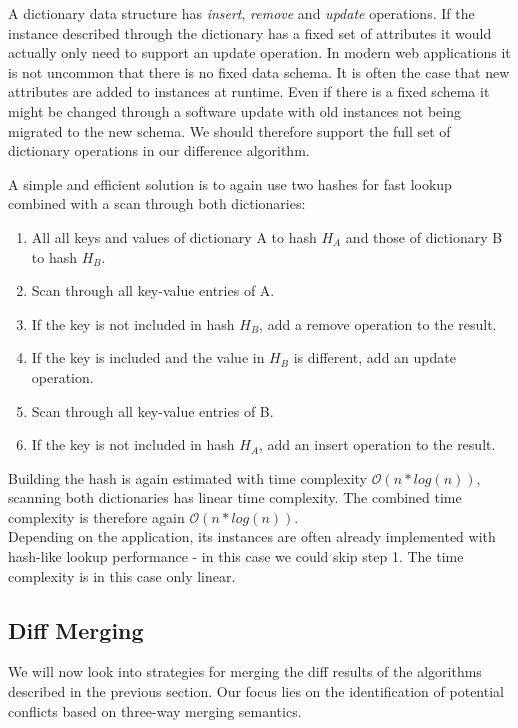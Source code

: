 A dictionary data structure has \emph{insert}, \emph{remove} and \emph{update} operations.
If the instance described through the dictionary has a fixed set of attributes it would actually only need to support an update operation.
In modern web applications it is not uncommon that there is no fixed data schema.
It is often the case that new attributes are added to instances at runtime.
Even if there is a fixed schema it might be changed through a software update with old instances not being migrated to the new schema.
We should therefore support the full set of dictionary operations in our difference algorithm.

A simple and efficient solution is to again use two hashes for fast lookup combined with a scan through both dictionaries:

\begin{enumerate}
\item All all keys and values of dictionary A to hash $ H_A $ and those of dictionary B to hash $ H_B $.
\item Scan through all key-value entries of A.
\item If the key is not included in hash $ H_B $, add a remove operation to the result.
\item If the key is included and the value in $ H_B $ is different, add an update operation.
\item Scan through all key-value entries of B.
\item If the key is not included in hash $ H_A $, add an insert operation to the result.
\end{enumerate}

Building the hash is again estimated with time complexity $ \mathcal O(n * log(n)) $, scanning both dictionaries has linear time complexity. The combined time complexity is therefore again $ \mathcal O(n * log(n)) $.\\
Depending on the application, its instances are often already implemented with hash-like lookup performance - in this case we could skip step 1.
The time complexity is in this case only linear.\\

\subsection{Diff Merging}
\label{sec:main.histo.merging.merge}

We will now look into strategies for merging the diff results of the algorithms described in the previous section.
Our focus lies on the identification of potential conflicts based on three-way merging semantics.\\

